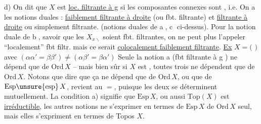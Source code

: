 d) On dit que $X$ est \uline{loc. filtrante à g} si les composantes connexes sont , i.e. 
On a les notions duales : \uline{faiblement filtrante à droite} (ou  fbt. filtrante) et \uline{filtrante à droite} ou simplement filtrante.  (notions duales de \textcircled{a}, \textcircled{c} ci-dessus).
Pour la notion duale de \textcircled{b}, savoir que les $X_{x\backslash}$ soient fbt. filtrantes, on ne peut plus l'appeler ``localement'' fbt filtr.  mais ce serait \uline{\uline{co}localement faiblement filtrante}.
\uline{Ex} $X=($
$)$ avec $(\alpha\alpha'=\beta\beta')\ne(\alpha\beta'=\beta\alpha')$  
 
Seule la notion a (fbt  filtrante à g ) ne dépend que de $\mathrm{Ord}\,X$ -- mais bien sûr si $X$ est , toutes trois ne dépendent que de $\mathrm{Ord}\,X$. Notons que dire que ça ne dépend que de $\mathrm{Ord}\,X$, ou que de $\mathrm{Esp}\unsure{\mathrm{esp}}\,X$, revient au $=$, puisque les deux se déterminent mutuellement. La condition a) signifie que $\mathrm{Esp}\,X$, ou aussi $\mathrm{Top}(X)$ est \uline{irréductible},  les  autres notions ne  s'exprimer en termes de $\mathrm{Esp}\,X$  de $\mathrm{Ord}\,X$ seul, mais elles s'expriment en termes de Topos $X$.

